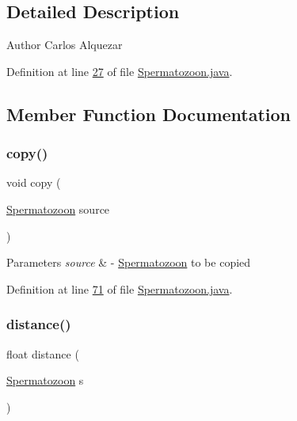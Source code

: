 \subsection{Detailed Description}
\begin{DoxyAuthor}{Author}
Carlos Alquezar 
\end{DoxyAuthor}


Definition at line \hyperlink{_spermatozoon_8java_source_l00027}{27} of file \hyperlink{_spermatozoon_8java_source}{Spermatozoon.\+java}.



\subsection{Member Function Documentation}
\hypertarget{classdata_1_1_spermatozoon_ac4622d389badba1a387ec1e139d35c8e}{}\label{classdata_1_1_spermatozoon_ac4622d389badba1a387ec1e139d35c8e} 
\subsubsection{\texorpdfstring{copy()}{copy()}}
{\footnotesize\ttfamily void copy (\begin{DoxyParamCaption}\item[{\hyperlink{classdata_1_1_spermatozoon}{Spermatozoon}}]{source }\end{DoxyParamCaption})}


\begin{DoxyParams}{Parameters}
{\em source} & -\/ \hyperlink{classdata_1_1_spermatozoon}{Spermatozoon} to be copied \\
\hline
\end{DoxyParams}


Definition at line \hyperlink{_spermatozoon_8java_source_l00071}{71} of file \hyperlink{_spermatozoon_8java_source}{Spermatozoon.\+java}.

\hypertarget{classdata_1_1_spermatozoon_aaef7a8e7602a08c82ea5fcbb777883e0}{}\label{classdata_1_1_spermatozoon_aaef7a8e7602a08c82ea5fcbb777883e0} 
\subsubsection{\texorpdfstring{distance()}{distance()}}
{\footnotesize\ttfamily float distance (\begin{DoxyParamCaption}\item[{\hyperlink{classdata_1_1_spermatozoon}{Spermatozoon}}]{s }\end{DoxyParamCaption})}


